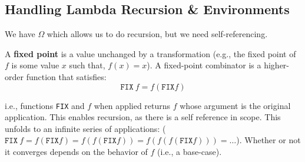 
        
\newpage 

\subsection{Handling Lambda Recursion \& Environments}
\noindent
We have $\Omega$ which allows us to do recursion, but we need self-referencing.

\begin{Def}
    
    A \textbf{fixed point} is a value unchanged by a transformation (e.g.,
    the fixed point of $f$ is some value $x$ such that, $f(x) = x$). A fixed-point combinator is a higher-order function that
    satisfies:
    \LARGE
    \[
     \texttt{FIX}\ f = f (\texttt{FIX} f)
    \]

    \normalsize
    \noindent
    i.e., functions \texttt{FIX} and $f$ when applied returns $f$ 
    whose argument is the original application. This enables recursion, as there is a 
    self reference in scope. This unfolds to an infinite series of applications:
    ($\texttt{FIX}\ f = f (\texttt{FIX} f)= f(f(\texttt{FIX} f)) = f(f(f(\texttt{FIX} f))) = \ldots$).
    Whether or not it converges depends on the behavior of $f$ (i.e., a base-case).
\end{Def}

